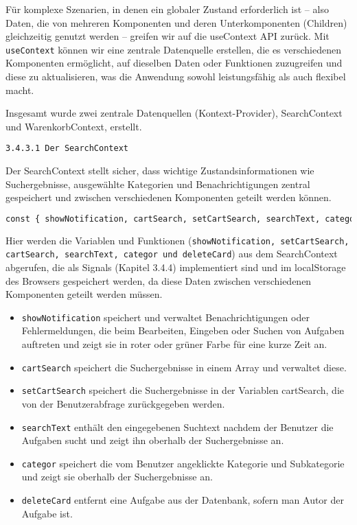 Für komplexe Szenarien, in denen ein globaler Zustand erforderlich ist – also Daten, die von mehreren Komponenten und deren Unterkomponenten (Children) gleichzeitig genutzt werden – greifen wir auf die useContext API zurück. Mit \texttt{useContext} können wir eine zentrale Datenquelle erstellen, die es verschiedenen Komponenten ermöglicht, auf dieselben Daten oder Funktionen zuzugreifen und diese zu aktualisieren, was die Anwendung sowohl leistungsfähig als auch flexibel macht.

Insgesamt wurde zwei zentrale Datenquellen (Kontext-Provider), SearchContext und WarenkorbContext, erstellt. 

\texttt{3.4.3.1 Der SearchContext}

Der SearchContext stellt sicher, dass wichtige Zustandsinformationen wie Suchergebnisse, ausgewählte Kategorien und Benachrichtigungen zentral gespeichert und zwischen verschiedenen Komponenten geteilt werden können. 


\begin{lstlisting}[language=Python]
const { showNotification, cartSearch, setCartSearch, searchText, categor, deleteCard } = useContext(SearchContext);
 \end{lstlisting}  
 
Hier werden die Variablen und Funktionen (\texttt{showNotification, setCartSearch, cartSearch, searchText, categor und deleteCard}) aus dem SearchContext abgerufen, die als Signals (Kapitel 3.4.4) implementiert sind und im localStorage des Browsers gespeichert werden, da diese Daten zwischen verschiedenen Komponenten geteilt werden müssen.

\begin{itemize}
  \item \texttt{showNotification} speichert und verwaltet Benachrichtigungen oder Fehlermeldungen, die beim Bearbeiten, Eingeben oder Suchen von Aufgaben auftreten und zeigt sie in roter oder grüner Farbe für eine kurze Zeit an.
  \item \texttt{cartSearch} speichert die Suchergebnisse in einem Array und verwaltet diese.
    \item \texttt{setCartSearch} speichert die Suchergebnisse in der Variablen cartSearch, die von der Benutzerabfrage zurückgegeben werden.
    \item \texttt{searchText} enthält den eingegebenen Suchtext nachdem der Benutzer die Aufgaben sucht und zeigt ihn oberhalb der Suchergebnisse an.
    \item \texttt{categor} speichert die vom Benutzer angeklickte Kategorie und Subkategorie und zeigt sie oberhalb der Suchergebnisse an.
    \item \texttt{deleteCard} entfernt eine Aufgabe aus der Datenbank, sofern man Autor der Aufgabe ist.
  
\end{itemize}

